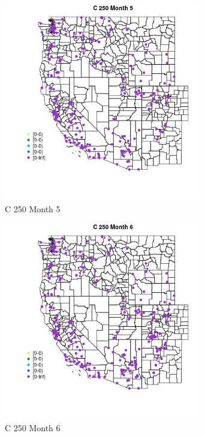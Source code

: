 \begin{figure} 
\centering  
\includegraphics[width=0.77\textwidth]{Code_Outputs/Report_ML_input_PM25_Step4_part_e_de_duplicated_aveswNAs_MapObsMo5C_250.jpg} 
\caption{\label{fig:Report_ML_input_PM25_Step4_part_e_de_duplicated_aveswNAsMapObsMo5C_250}C 250 Month 5} 
\end{figure} 
 

\begin{figure} 
\centering  
\includegraphics[width=0.77\textwidth]{Code_Outputs/Report_ML_input_PM25_Step4_part_e_de_duplicated_aveswNAs_MapObsMo6C_250.jpg} 
\caption{\label{fig:Report_ML_input_PM25_Step4_part_e_de_duplicated_aveswNAsMapObsMo6C_250}C 250 Month 6} 
\end{figure} 
 

